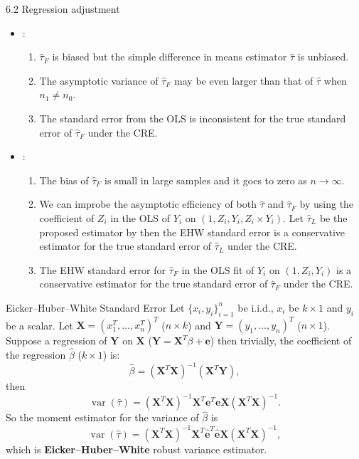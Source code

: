 \documentclass[aspectratio=169, 12pt]{beamer}
\begin{document}
\begin{frame}{6.2 Regression adjustment}
  \begin{itemize}
    \item \citet{freedman2008regression_1,freedman2008regression_2}:
    \begin{enumerate}
      \item $\widehat{\tau}_F$ is biased but the simple difference in means estimator $\widehat{\tau}$ is unbiased.
      \item The asymptotic variance of $\widehat{\tau}_F$ may be even larger than that of $\widehat{\tau}$ when $n_1\neq n_0$.
      \item The standard error from the OLS is inconsistent for the true standard error of $\widehat{\tau}_F$ under the CRE.
    \end{enumerate}
    \item \citet{lin2013agnostic}:
    \begin{enumerate}
      \item The bias of $\widehat{\tau}_F$ is small in large samples and it goes to zero as $n\to\infty$.
      \item We can improbe the asymptotic efficiency of both $\widehat{\tau}$ and $\widehat{\tau}_F$ by using the coefficient of $Z_i$ in the OLS of $Y_i$ on $(1,Z_i,Y_i,Z_i\times Y_i)$. Let $\widehat{\tau}_L$ be the proposed estimator by \citet{lin2013agnostic} then the EHW standard error is a conservative estimator for the true standard error of $\widehat{\tau}_L$ under the CRE.
      \item The EHW standard error for $\widehat{\tau}_F$ in the OLS fit of $Y_i$ on $(1,Z_i,Y_i)$ is a conservative estimator for the true standard error of $\widehat{\tau}_F$ under the CRE.
    \end{enumerate}
  \end{itemize}
\end{frame}

\begin{frame}{Eicker–Huber–White Standard Error}
  Let $\{x_i,y_i\}_{i=1}^{n}$ be i.i.d., $x_i$ be $k\times 1$ and $y_i$ be a scalar. Let $\bm{X}=(x_1^T,\dots,x_n^T)^T$ ($n\times k$) and $\bm{Y}=(y_1,\dots,y_n)^T$ ($n\times 1$). Suppose a regression of $\bm{Y}$ on $\bm{X}$ ($\bm{Y}=\bm{X}^T\beta+\bm{e}$) then trivially, the coefficient of the regression $\widehat{\beta}$ ($k \times 1$) is:
  \[
  \widehat{\beta} = (\bm{X}^T\bm{X})^{-1}(\bm{X}^T\bm{Y}),
  \]
  then
  \[
  \operatorname{var}(\widehat{\tau}) = (\bm{X}^T\bm{X})^{-1}\bm{X}^T\bm{e}^T\bm{e}\bm{X}(\bm{X}^T\bm{X})^{-1}.
  \]
  So the moment estimator for the variance of $\widehat{\beta}$ is
  \[
  \operatorname{var}(\widehat{\tau}) = (\bm{X}^T\bm{X})^{-1}\bm{X}^T\widehat{\bm{e}}^T\widehat{\bm{e}}\bm{X}(\bm{X}^T\bm{X})^{-1},
  \]
  which is \textbf{Eicker–Huber–White} robust variance estimator.
\end{frame}
\end{document}
